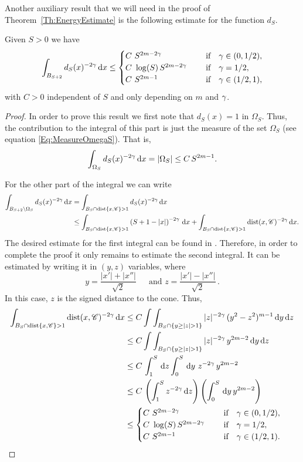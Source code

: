 Another auxiliary result that we will need in the proof of Theorem~\ref{Th:EnergyEstimate} is the following estimate for the function $d_S$. 

\begin{lemma}
\label{Lemma:Integrability_dFunction}
Given $S>0$ we have
$$ \int_{B_{S+2}} d_S(x)^{-2\gamma} \,\mathrm{d} x \leq \begin{cases}
C \ S^{2m-2\gamma}\ \ \ \ &\textrm{if } \ \ \gamma\in(0,1/2),\\
C\ \log(S)\,S^{2m-2\gamma}\ \ \ \ &\textrm{if } \ \ \gamma=1/2,\\
C \ S^{2m-1}\ \ \ \ &\textrm{if } \ \ \gamma\in(1/2,1),\\
\end{cases} $$
with $C>0$ independent of $S$ and only depending on $m$ and $\gamma$.
\end{lemma}


\begin{proof}
In order to prove this result we first note that $d_S(x)=1$ in $\Omega_S$. Thus, the contribution to the integral of this part is just the measure of the set $\Omega_S$ (see equation \eqref{Eq:MeasureOmegaS}). That is,
$$\int_{\Omega_S} d_S(x)^{-2\gamma} \,\mathrm{d} x = |\Omega_S| \leq C\,S^{2m-1}.$$

For the other part of the integral we can write
\begin{align*}
\int_{B_{S+2}\setminus \Omega_S} d_S(x)^{-2\gamma} \,\mathrm{d} x &= \int_{B_{S}\cap \operatorname{dist}\{x,\mathscr{C}\}>1} d_S(x)^{-2\gamma} \,\mathrm{d} x \\
& \leq \int_{B_{S}\cap \operatorname{dist}\{x,\mathscr{C}\}>1} \left( S+1-|x| \right)^{-2\gamma} \,\mathrm{d} x + \int_{B_{S}\cap \operatorname{dist}\{x,\mathscr{C}\}>1} \operatorname{dist}(x,\mathscr{C})^{-2\gamma} \,\mathrm{d} x.
\end{align*}
The desired estimate for the first integral can be found in \cite{SavinValdinoci-EnergyEstimate}. Therefore, in order to complete the proof it only remains to estimate the second integral. It can be estimated by writing it in $(y,z)$ variables, where
$$
y = \dfrac{|x'|+|x''|}{\sqrt{2}} \, \quad \text{ and } z = \dfrac{|x'|-|x''|}{\sqrt{2}}\,.
$$
In this case, $z$ is the signed distance to the cone. Thus,
\begin{align*}
\int_{B_{S}\cap \dist\{x,\ccal\}>1} \dist(x,\ccal)^{-2\s} \d x &\leq C \int \int_{B_{S}\cap \{y\geq|z|>1\}} |z|^{-2\s} \, (y^2-z^2)^{m-1} \d y\d z \\
& \leq C \int \int_{B_{S}\cap \{y\geq|z|>1\}} |z|^{-2\s} \, y^{2m-2} \d y\d z \\
& \leq C\, \int_1^S \d z \int_0^S \d y\ z^{-2\s} \, y^{2m-2} \\
& \leq C\, \left(\int_1^S z^{-2\s} \d z \right)  \left(  \int_0^S \d y \, y^{2m-2} \right) \\
& \leq \begin{cases}
C \ S^{2m-2\s}\ \ \ \ &\textrm{if } \ \ \s\in(0,1/2),\\
C\ \log(S)\,S^{2m-2\s}\ \ \ \ &\textrm{if } \ \ \s=1/2,\\
C \ S^{2m-1}\ \ \ \ &\textrm{if } \ \ \s\in(1/2,1).\\
\end{cases}
\end{align*}
\end{proof}


